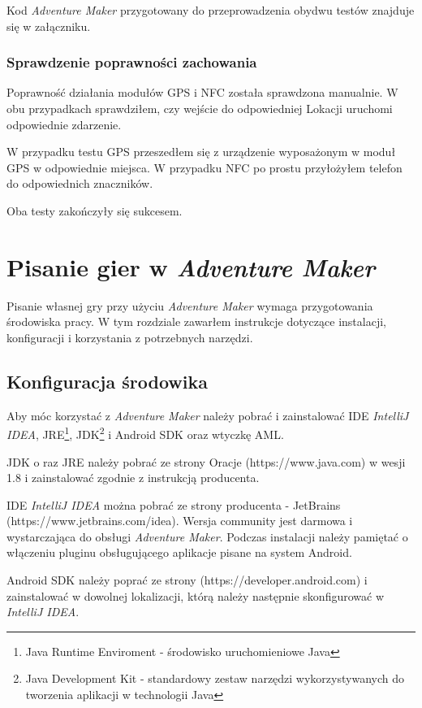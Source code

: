 \documentclass[openright]{xmgr}
\begin{document}
Kod \textit{Adventure Maker} przygotowany do przeprowadzenia obydwu testów znajduje się w załączniku.

\subsection{Sprawdzenie poprawności zachowania}

Poprawność działania modułów GPS i NFC została sprawdzona manualnie. W obu przypadkach sprawdziłem, czy wejście do odpowiedniej Lokacji uruchomi odpowiednie zdarzenie.

W przypadku testu GPS przeszedłem się z urządzenie wyposażonym w moduł GPS w odpowiednie miejsca. W przypadku NFC po prostu przyłożyłem telefon do odpowiednich znaczników. 

Oba testy zakończyły się sukcesem.  

\chapter{Pisanie gier w \textit{Adventure Maker}}
Pisanie własnej gry przy użyciu \textit{Adventure Maker} wymaga przygotowania środowiska pracy. W tym rozdziale zawarłem instrukcje dotyczące instalacji, konfiguracji i korzystania z potrzebnych narzędzi. 

\section{Konfiguracja środowika}

Aby móc korzystać z \textit{Adventure Maker} należy pobrać i zainstalować IDE \textit{IntelliJ IDEA}, JRE\footnote{Java Runtime Enviroment - środowisko uruchomieniowe Java}, JDK\footnote{Java Development Kit - standardowy zestaw narzędzi wykorzystywanych do tworzenia aplikacji w technologii Java} i Android SDK oraz wtyczkę AML.

JDK o raz JRE należy pobrać ze strony Oracje (https://www.java.com) w wesji 1.8 i zainstalować zgodnie z instrukcją producenta.

IDE \textit{IntelliJ IDEA} można pobrać ze strony producenta - JetBrains (https://www.jetbrains.com/idea). Wersja community jest darmowa i wystarczająca do obsługi \textit{Adventure Maker}. Podczas instalacji należy pamiętać o włączeniu pluginu obsługującego aplikacje pisane na system Android.

Android SDK  należy poprać ze strony (https://developer.android.com) i zainstalować w dowolnej lokalizacji, którą należy następnie skonfigurować w \textit{IntelliJ IDEA}.
\end{document}
